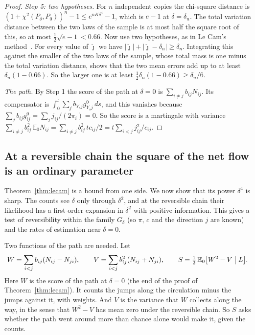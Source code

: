 \documentclass[11pt]{article}
\theoremstyle{definition}
\theoremstyle{remark}
\newcommand{\E}{\mathbb E}
\begin{document}
\begin{proof}
\emph{Step 5: two hypotheses.} For $n$ independent copies the chi-square
distance is $(1+\chi^2(P_\delta,P_0))^n-1\le e^{nK\delta^4}-1$, which is $e-1$
at $\delta=\delta_n$. The total variation distance between the two laws of the
sample is at most half the square root of this, so at most
$\frac12\sqrt{e-1}<0.66$. Now use two hypotheses, as in Le Cam's
method~\cite[Chapter~2]{tsybakov2009}. For every value of $\hat\jmath$ we have
$\lvert\hat\jmath\rvert+\lvert\hat\jmath-\delta_n\rvert\ge\delta_n$.
Integrating this against the smaller of the two laws of the sample, whose
total mass is one minus the total variation distance, shows that the two mean
errors add up to at least $\delta_n(1-0.66)$. So the larger one is at least
$\frac12\delta_n(1-0.66)\ge\delta_n/6$.

\emph{The path.} By Step 1 the score of the path at $\delta=0$ is
$\sum_{i\ne j}b_{ij}N_{ij}$. Its compensator is
$\int_0^t\sum_jb_{Y_sj}g^0_{Y_sj}\,ds$, and this vanishes because
$\sum_jb_{ij}g^0_{ij}=\sum_jj_{ij}/(2\pi_i)=0$. So the score is a martingale
with variance $\sum_{i\ne j}b_{ij}^2\,\E_0N_{ij}=\sum_{i\ne j}b_{ij}^2\,tc_{ij}/2
=t\sum_{i<j}j_{ij}^2/c_{ij}$.
\end{proof}

\subsection{At a reversible chain the square of the net flow is an ordinary parameter}

Theorem~\ref{thm:lecam} is a bound from one side. We now show that its power
$\delta^4$ is sharp. The counts see $\delta$ only through $\delta^2$, and at
the reversible chain their likelihood has a first-order expansion in
$\delta^2$ with positive information. This gives a test of reversibility
within the family $G_\delta$ (so $\pi$, $c$ and the direction $j$ are known)
and the rates of estimation near $\delta=0$.

Two functions of the path are needed. Let
\[
 W=\sum_{i<j}b_{ij}(N_{ij}-N_{ji}),\qquad
 V=\sum_{i<j}b_{ij}^2(N_{ij}+N_{ji}),\qquad
 S=\tfrac12\,\E_0\bigl[W^2-V\bigm|L\bigr].
\]
Here $W$ is the score of the path at $\delta=0$ (the end of the proof of
Theorem~\ref{thm:lecam}). It counts the jumps along the circulation minus the
jumps against it, with weights. And $V$ is the variance that $W$ collects
along the way, in the sense that $W^2-V$ has mean zero under the reversible
chain. So $S$ asks whether the path went around more than chance alone would
make it, given the counts.
\end{document}
